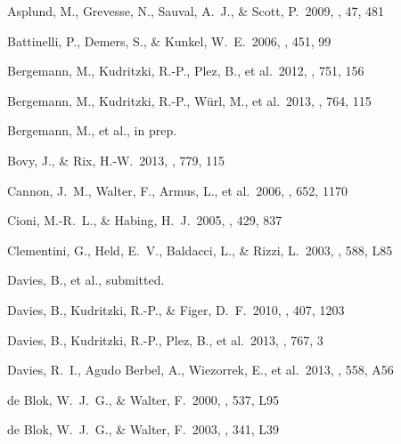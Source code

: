 \documentclass[iop]{emulateapj}
\begin{document}
% 


\begin{thebibliography}{}
 Asplund, M., Grevesse, N., Sauval, A.~J., \& Scott, P.\ 2009, \araa, 47, 481 

 Battinelli, P., Demers, S., \& Kunkel, W.~E.\ 2006, \aap, 451, 99 

 Bergemann, M., 
Kudritzki, R.-P., Plez, B., et al.\ 2012, \apj, 751, 156 

 Bergemann, M., 
Kudritzki, R.-P., W{\"u}rl, M., et al.\ 2013, \apj, 764, 115 

 Bergemann, M., 
et al., in prep. 

 Bovy, J., \& Rix, H.-W.\ 2013, \apj, 779, 115 

 Cannon, J.~M., Walter, 
F., Armus, L., et al.\ 2006, \apj, 652, 1170 

 Cioni, M.-R.~L., \& Habing, H.~J.\ 2005, \aap, 429, 837 

 Clementini, G., 
Held, E.~V., Baldacci, L., \& Rizzi, L.\ 2003, \apjl, 588, L85 

 Davies, B., 
et al., submitted. 

 Davies, B., Kudritzki, 
R.-P., \& Figer, D.~F.\ 2010, \mnras, 407, 1203 

 Davies, B., Kudritzki, 
R.-P., Plez, B., et al.\ 2013, \apj, 767, 3 

 Davies, R.~I., Agudo Berbel, A., Wiezorrek, E., et al.\ 2013, \aap, 558, A56 

 de Blok, W.~J.~G., \& Walter, F.\ 2000, \apjl, 537, L95 

 de Blok, W.~J.~G., \& Walter, F.\ 2003, \mnras, 341, L39 


\end{thebibliography}
\end{document}
